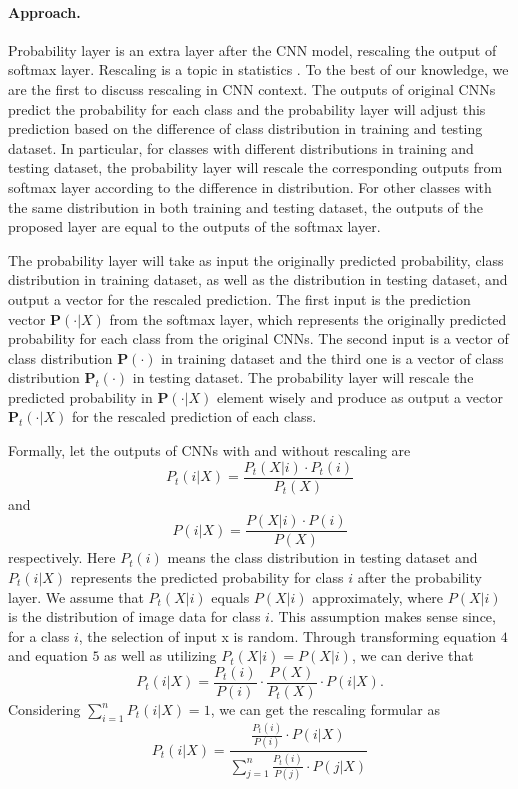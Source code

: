 \documentclass[pageno]{jpaper}
\begin{document}
\paragraph{Approach. } Probability layer is an extra layer after the CNN model, rescaling the output of softmax layer. Rescaling is a topic in statistics \cite{saerens2002adjusting}. To the best of our knowledge, we are the first to discuss rescaling in CNN context. The outputs of original CNNs predict the probability for each class and the probability layer will adjust this prediction based on the difference of class distribution in training and testing dataset. In particular, for classes with different distributions in training and testing dataset, the probability layer will rescale the corresponding outputs from softmax layer according to the difference in distribution. For other classes with the same distribution in both training and testing dataset, the outputs of the proposed layer are equal to the outputs of the softmax layer. 


The probability layer will take as input the originally predicted probability, class distribution in training dataset, as well as the distribution in testing dataset, and output a vector for the rescaled prediction. The first input is the prediction vector $\mathbf{P}(\cdot|X)$ from the softmax layer, which represents the originally predicted probability for each class from the original CNNs. The second input is a vector of class distribution $\mathbf{P}(\cdot)$ in training dataset and the third one is a vector of class distribution $\mathbf{P}_t(\cdot)$ in testing dataset. The probability layer will rescale the predicted probability in $\mathbf{P}(\cdot|X)$ element wisely and produce as output a vector $\mathbf{P}_t(\cdot|X)$ for the rescaled prediction of each class.

Formally, let the outputs of CNNs with and without rescaling are
\begin{equation}
    P_t(i|X) = \frac{P_t(X|i) \cdot P_t(i)}{P_t(X)}
\end{equation}
and
\begin{equation}
    P(i|X) = \frac{P(X|i) \cdot P(i)}{P(X)}
\end{equation}
respectively. Here $P_t(i)$ means the class distribution in testing dataset and $P_t(i|X)$ represents the predicted probability for class $i$ after the probability layer. We assume that $P_t(X|i)$ equals $P(X|i)$ approximately, where $P(X|i)$ is the distribution of image data for class $i$. This assumption makes sense since, for a class $i$, the selection of input x is random. Through transforming equation $4$ and equation $5$ as well as utilizing $P_t(X|i) = P(X|i)$, we can derive that 
\begin{equation}
    P_t(i|X) = \frac{P_t(i)}{P(i)} \cdot \frac{P(X)}{P_t(X)} \cdot P(i|X).
\end{equation}Considering $\sum_{i=1}^n P_t(i|X) = 1$, we can get the rescaling formular as
\begin{equation}
    P_t(i|X) = \frac{\frac{P_t(i)}{P(i)} \cdot P(i|X)}{\sum_{j=1}^n \frac{P_t(i)}{P(j)} \cdot P(j|X)}
\end{equation}
\end{document}
